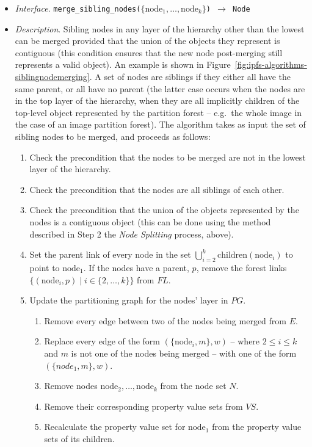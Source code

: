 \begin{itemize}

\item \emph{Interface}. \texttt{merge_sibling_nodes($\{\mbox{node}_1,\ldots,\mbox{node}_k\}$) $\rightarrow$ Node}

\item \emph{Description}. Sibling nodes in any layer of the hierarchy other than the lowest can be merged provided that the union of the objects they represent is contiguous (this condition ensures that the new node post-merging still represents a valid object). An example is shown in Figure~\ref{fig:ipfs-algorithms-siblingnodemerging}. A set of nodes are siblings if they either all have the same parent, or all have no parent (the latter case occurs when the nodes are in the top layer of the hierarchy, when they are all implicitly children of the top-level object represented by the partition forest -- e.g.~the whole image in the case of an image partition forest). The algorithm takes as input the set of sibling nodes to be merged, and proceeds as follows:

\begin{enumerate}

\item Check the precondition that the nodes to be merged are not in the lowest layer of the hierarchy.

\item Check the precondition that the nodes are all siblings of each other.

\item Check the precondition that the union of the objects represented by the nodes is a contiguous object (this can be done using the method described in Step 2 the \emph{Node Splitting} process, above).

\item Set the parent link of every node in the set $\bigcup_{i=2}^k \mbox{children}(\mbox{node}_i)$ to point to $\mbox{node}_1$. If the nodes have a parent, $p$, remove the forest links $\{(\mbox{node}_i, p) \; | \; i \in \{2,\ldots,k\}\}$ from $\textit{FL}$.

\item Update the partitioning graph for the nodes' layer in $\textit{PG}$.

\begin{enumerate}

\item Remove every edge between two of the nodes being merged from $E$.
\item Replace every edge of the form $(\{\mbox{node}_i, m\}, w)$ -- where $2 \le i \le k$ and $m$ is not one of the nodes being merged -- with one of the form $(\{node_1, m\}, w)$.
\item Remove nodes $\mbox{node}_2,\ldots,\mbox{node}_k$ from the node set $N$.
\item Remove their corresponding property value sets from $\textit{VS}$.
\item Recalculate the property value set for $\mbox{node}_1$ from the property value sets of its children.


\end{enumerate}
\end{enumerate}
\end{itemize}

